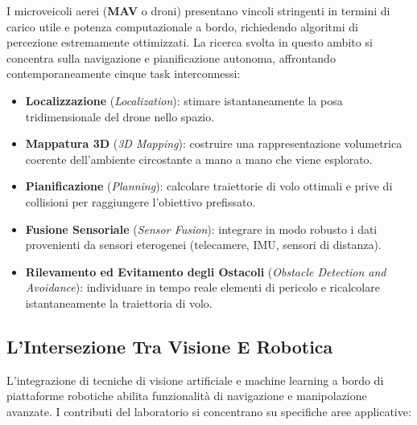 ﻿\documentclass[11pt, a4paper]{article}
\begin{document}
I microveicoli aerei (\textbf{MAV} o droni) presentano vincoli stringenti in termini di carico utile e potenza computazionale a bordo, richiedendo algoritmi di percezione estremamente ottimizzati. La ricerca svolta in questo ambito si concentra sulla navigazione e pianificazione autonoma, affrontando contemporaneamente cinque task interconnessi:

\begin{itemize}[noitemsep]
    \item \textbf{Localizzazione} (\emph{Localization}): stimare istantaneamente la posa tridimensionale del drone nello spazio.
    \item \textbf{Mappatura 3D} (\emph{3D Mapping}): costruire una rappresentazione volumetrica coerente dell'ambiente circostante a mano a mano che viene esplorato.
    \item \textbf{Pianificazione} (\emph{Planning}): calcolare traiettorie di volo ottimali e prive di collisioni per raggiungere l'obiettivo prefissato.
    \item \textbf{Fusione Sensoriale} (\emph{Sensor Fusion}): integrare in modo robusto i dati provenienti da sensori eterogenei (telecamere, IMU, sensori di distanza).
    \item \textbf{Rilevamento ed Evitamento degli Ostacoli} (\emph{Obstacle Detection and Avoidance}): individuare in tempo reale elementi di pericolo e ricalcolare istantaneamente la traiettoria di volo.
\end{itemize}


\subsection{L'Intersezione Tra Visione E Robotica}

L'integrazione di tecniche di visione artificiale e machine learning a bordo di piattaforme robotiche abilita funzionalità di navigazione e manipolazione avanzate. I contributi del laboratorio si concentrano su specifiche aree applicative:

\end{document}
